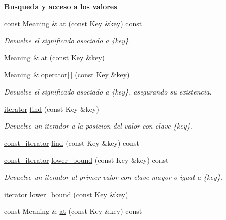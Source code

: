 \begin{Indent}\textbf{ Busqueda y acceso a los valores}\par
\begin{DoxyCompactItemize}
\item 
const Meaning \& \hyperlink{classaed2_1_1map_a579c9179b42175c23a1013ac7f1b876c}{at} (const Key \&key) const
\begin{DoxyCompactList}\small\item\em Devuelve el significado asociado a \{key\}. \end{DoxyCompactList}\item 
Meaning \& \hyperlink{classaed2_1_1map_a6b21c09f59a83b6ee45432dcfa61f4a1}{at} (const Key \&key)
\item 
Meaning \& \hyperlink{classaed2_1_1map_a96f23896164ab47bee48c26b803f9801}{operator\mbox{[}$\,$\mbox{]}} (const Key \&key)
\begin{DoxyCompactList}\small\item\em Devuelve el significado asociado a \{key\}, asegurando su existencia. \end{DoxyCompactList}\item 
\hyperlink{classaed2_1_1map_1_1iterator}{iterator} \hyperlink{classaed2_1_1map_afd0fc1a8234888e61e0e615de7e245b8}{find} (const Key \&key)
\begin{DoxyCompactList}\small\item\em Devuelve un iterador a la posicion del valor con clave \{key\}. \end{DoxyCompactList}\item 
\hyperlink{classaed2_1_1map_1_1const__iterator}{const\+\_\+iterator} \hyperlink{classaed2_1_1map_adbf6f4ce01a16ca506e3c75fc2843882}{find} (const Key \&key) const
\item 
\hyperlink{classaed2_1_1map_1_1const__iterator}{const\+\_\+iterator} \hyperlink{classaed2_1_1map_a62075a47afdf89267c5462f88164af3d}{lower\+\_\+bound} (const Key \&key) const
\begin{DoxyCompactList}\small\item\em Devuelve un iterador al primer valor con clave mayor o igual a \{key\}. \end{DoxyCompactList}\item 
\hyperlink{classaed2_1_1map_1_1iterator}{iterator} \hyperlink{classaed2_1_1map_a07b3dd65557c59ee085e5f211269c6b3}{lower\+\_\+bound} (const Key \&key)
\item 
const Meaning \& \hyperlink{classaed2_1_1map_a579c9179b42175c23a1013ac7f1b876c}{at} (const Key \&key) const

\end{DoxyCompactItemize}
\end{Indent}
